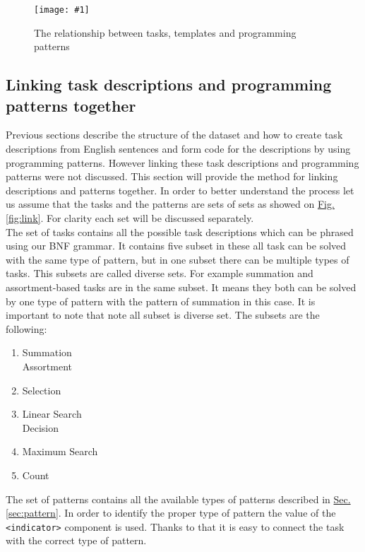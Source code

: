 \documentclass[12pt]{article}
\newcommand{\refThis}[2]{\hyperref[#1]{#2 \ref{#1}}}
\newcommand{\insertPic}[3]
{   %
        \begin{figure}[h!]				
        \centering							
        \texttt{[image: \#1]}
        \caption{#3}						
        \label{fig:#1}						
        \end{figure}		
}
\begin{document}
    \insertPic{temp}{0.3}{The relationship between tasks, templates and programming patterns}
    
    \subsection{Linking task descriptions and programming patterns together}\label{sub:link}
    Previous sections describe the structure of the dataset and how to create task descriptions from English sentences and form code for the descriptions by using programming patterns. However linking these task descriptions and programming patterns were not discussed. This section will provide the method for linking descriptions and patterns together. In order to better understand the process let us assume that the tasks and the patterns are sets of sets as showed on \refThis{fig:link}{Fig.}. For clarity each set will be discussed separately.\\
    The set of tasks contains all the possible task descriptions which can be phrased using our BNF grammar. It contains five subset in these all task can be solved with the same type of pattern, but in one subset there can be multiple types of tasks. This subsets are called diverse sets. For example summation and assortment-based tasks are in the same subset. It means they both can be solved by one type of pattern with the pattern of summation in this case. It is important to note that note all subset is diverse set. The subsets are the following:\\
    \begin{enumerate}[label = (\arabic*), noitemsep, leftmargin=1.5cm, topsep=0cm]
            \item Summation \\ Assortment
            \item Selection
            \item Linear Search \\ Decision
            \item Maximum Search
            \item Count
        \label{list:prog_theses}
        \end{enumerate}
    The set of patterns contains all the available types of patterns described in \refThis{sec:pattern}{Sec.}. In order to identify the proper type of pattern the value of the \verb|<indicator>| component is used. Thanks to that it is easy to connect the task with the correct type of pattern.\\
\end{document}
